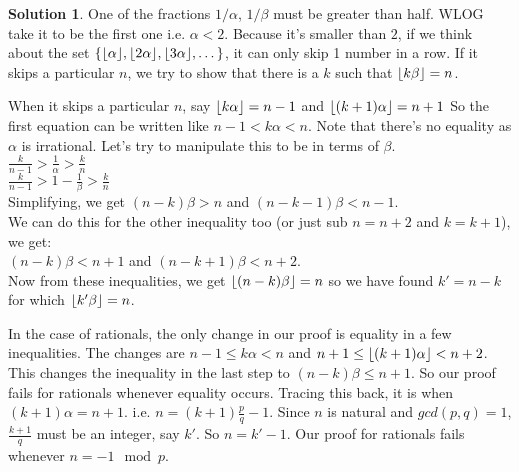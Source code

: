 \documentclass[a4paper,10pt]{article}
\theoremstyle{definition} %
\newtheorem*{solution}{Solution}
\DeclarePairedDelimiter\floor{\lfloor}{\rfloor} %
\begin{document}
    \begin{solution}
        One of the fractions $1/\alpha$, $1/\beta$ must be greater than half. WLOG take it
        to be the first one i.e. $\alpha < 2$. Because it's smaller than $2$, if we think about
        the set $\{\floor{\alpha}, \floor{2\alpha}, \floor{3\alpha}, \dots\}$, it can only skip
        1 number in a row. If it skips a particular $n$, we try to show that there is a $k$ 
        such that $\floor{k\beta} = n$.

        When it skips a particular $n$, say $\floor{k\alpha} = n-1$ and 
        $\floor{(k+1)\alpha} = n+1$
        So the first equation can be written like $n-1 < k\alpha < n$. Note that there's no equality
        as $\alpha$ is irrational. Let's try to manipulate this to be in terms of $\beta$. \\
        $\frac{k}{n-1} > \frac{1}{\alpha} > \frac{k}{n}$ \\
        $\frac{k}{n-1} > 1 - \frac{1}{\beta} > \frac{k}{n}$ \\
        Simplifying, we get $(n-k)\beta > n$ and $(n-k-1)\beta < n-1$. \\
        We can do this for the other inequality too (or just sub $n=n+2$ and $k=k+1$), we get: \\
        $(n-k)\beta < n+1$ and $(n-k+1)\beta < n+2$. \\
        Now from these inequalities, we get $\floor{(n-k)\beta} = n$ so we have found $k' = n-k$
        for which $\floor{k'\beta} = n$.

        In the case of rationals, the only change in our proof is equality in a few inequalities.
        The changes are $n-1 \leq k\alpha < n$ and $ n+1 \leq \floor{(k+1)\alpha} < n+2$.
        This changes the inequality in the last step to $(n-k)\beta \leq n+1$. So our proof
        fails for rationals whenever equality occurs. Tracing this back, it is when $(k+1)\alpha = n+1$.
        i.e. $n = (k+1)\frac{p}{q} - 1$. Since $n$ is natural and $gcd(p,q)=1$, $\frac{k+1}{q}$
        must be an integer, say $k'$. So $n = k' - 1$. Our proof for rationals fails 
        whenever $n = -1 \mod p$.

    \end{solution}
\end{document}

